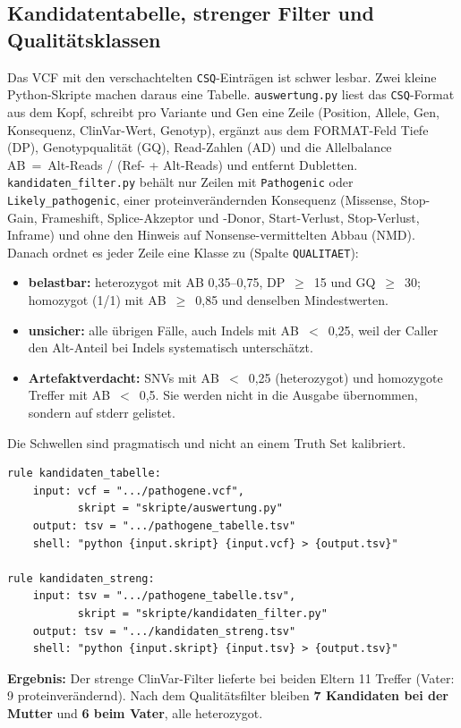 \documentclass[10pt,a4paper,twocolumn]{article}
\begin{document}
\subsection{Kandidatentabelle, strenger Filter und Qualitätsklassen}
Das VCF mit den verschachtelten \texttt{CSQ}-Einträgen ist schwer lesbar. Zwei kleine Python-Skripte machen daraus eine Tabelle. \texttt{auswertung.py} liest das \texttt{CSQ}-Format aus dem Kopf, schreibt pro Variante und Gen eine Zeile (Position, Allele, Gen, Konsequenz, ClinVar-Wert, Genotyp), ergänzt aus dem FORMAT-Feld Tiefe (DP), Genotypqualität (GQ), Read-Zahlen (AD) und die Allelbalance AB~=~Alt-Reads / (Ref- + Alt-Reads) und entfernt Dubletten. \texttt{kandidaten\_filter.py} behält nur Zeilen mit \texttt{Pathogenic} oder \texttt{Likely\_pathogenic}, einer proteinverändernden Konsequenz (Missense, Stop-Gain, Frameshift, Splice-Akzeptor und -Donor, Start-Verlust, Stop-Verlust, Inframe) und ohne den Hinweis auf Nonsense-vermittelten Abbau (NMD). Danach ordnet es jeder Zeile eine Klasse zu (Spalte \texttt{QUALITAET}):
\begin{itemize}
\item \textbf{belastbar:} heterozygot mit AB 0,35--0,75, DP~$\geq$~15 und GQ~$\geq$~30; homozygot (1/1) mit AB~$\geq$~0,85 und denselben Mindestwerten.
\item \textbf{unsicher:} alle übrigen Fälle, auch Indels mit AB~$<$~0,25, weil der Caller den Alt-Anteil bei Indels systematisch unterschätzt.
\item \textbf{Artefaktverdacht:} SNVs mit AB~$<$~0,25 (heterozygot) und homozygote Treffer mit AB~$<$~0,5. Sie werden nicht in die Ausgabe übernommen, sondern auf stderr gelistet.
\end{itemize}
Die Schwellen sind pragmatisch und nicht an einem Truth Set kalibriert.
\begin{lstlisting}
rule kandidaten_tabelle:
    input: vcf = ".../pathogene.vcf",
           skript = "skripte/auswertung.py"
    output: tsv = ".../pathogene_tabelle.tsv"
    shell: "python {input.skript} {input.vcf} > {output.tsv}"
 
rule kandidaten_streng:
    input: tsv = ".../pathogene_tabelle.tsv",
           skript = "skripte/kandidaten_filter.py"
    output: tsv = ".../kandidaten_streng.tsv"
    shell: "python {input.skript} {input.tsv} > {output.tsv}"
\end{lstlisting}
\textbf{Ergebnis:} Der strenge ClinVar-Filter lieferte bei beiden Eltern 11 Treffer (Vater: 9 proteinverändernd). Nach dem Qualitätsfilter bleiben \textbf{7 Kandidaten bei der Mutter} und \textbf{6 beim Vater}, alle heterozygot.
 
\end{document}
